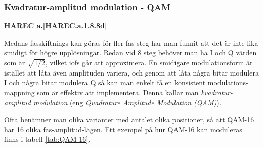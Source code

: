\subsubsection{Kvadratur-amplitud modulation - QAM}
\textbf{HAREC a.\ref{HAREC.a.1.8.8d}\label{myHAREC.a.1.8.8d}}
\label{QAM}
\begin{rev-nytt}[MAD]

Medans fasskiftnings kan göras för fler fas-steg har man funnit att det är
inte lika smidigt för högre upplösningar. Redan vid 8 steg behöver man ha
I och Q värden som är \(\sqrt{1/2}\), vilket iofs går att approximera.
En smidigare modulationsform är istället att låta även amplituden variera,
och genom att låta några bitar modulera I och några bitar modulera Q så kan
man enkelt få en konsistent modulations-mappning som är effektiv att
implementera. Denna kallar man \emph{kvadratur-amplitud modulation} (eng
\emph{Quadrature Amplitude Modulation (QAM)}).

Ofta benämner man olika varianter med antalet olika positioner, så att QAM-16
har 16 olika fas-amplitud-lägen. Ett exempel på hur QAM-16 kan moduleras finns
i tabell \ref{tab:QAM-16}.


\end{rev-nytt}

